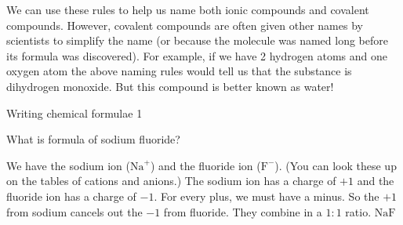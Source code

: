 	\par
\label{m38708*eip-163}We can use these rules to help us name both ionic compounds and covalent compounds. However, covalent compounds are often given other names by scientists to simplify the name (or because the molecule was named long before its formula was discovered). For example, if we have 2 hydrogen atoms and one oxygen atom the above naming rules would tell us that the substance is dihydrogen monoxide. But this compound is better known as water!  \par \label{m38708*eip-254} \vspace{-1cm} 
      \begin{wex}{Writing chemical formulae 1}
{\label{m38708*eip-671}
  \label{m38708*eip-870}
    What is formula of sodium fluoride?
  \par 
\vspace{5pt}}
{
We have the sodium ion ($\mathrm{Na}^{+}$) and the fluoride ion ($\mathrm{F}^{-}$). (You can look these up on the tables of cations and anions.)
The sodium ion has a charge of $+1$ and the fluoride ion has a charge of $-1$.
For every plus, we must have a minus. So the $+1$ from sodium cancels out the $-1$ from fluoride. They combine in a $1:1$ ratio.
$\mathrm{NaF}$
}
\end{wex} \vspace{-2cm}
